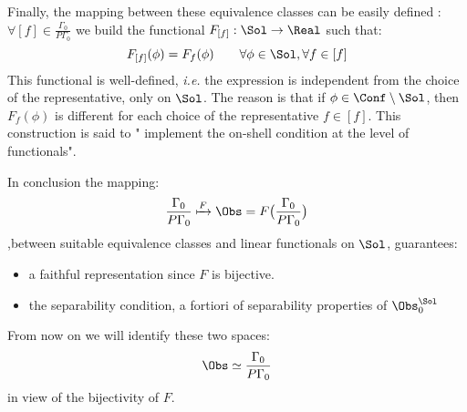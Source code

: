 \documentclass[Main]{subfiles}
\begin{document}
   					Finally, the mapping between these equivalence classes can be easily defined :\\
   					$\forall [f] \in \frac{\Gamma_0}{P\Gamma_0}$ we build the functional $F_{[f]} : \Sol \rightarrow  \Real$ such that:
   					\begin{displaymath}
   						F_{[f]} (\phi) = F_f(\phi) \qquad \forall \phi \in \Sol , \forall f \in [f]
   					\end{displaymath}
   					This functional is well-defined, \textit{i.e.} the expression is independent from the choice of the representative, only on $\Sol$. 
   					The reason is that if $\phi \in \Conf \setminus \Sol$, then $F_f(\phi)$ is different for each choice of the representative $f \in [f]$.
   					This construction is said to " implement the  on-shell condition at the level of functionals".
   					
   					In conclusion the mapping:
   					\begin{displaymath}
   						\frac{\Gamma_0}{P \Gamma_0}  \xmapsto{F} \Obs = F \big( \frac{\Gamma_0}{P \Gamma_0}\big)
   					\end{displaymath}
   					,between suitable equivalence classes  and linear functionals on $\Sol$, guarantees:
   					\begin{itemize}
   						\item a faithful representation since $F$ is bijective.
   						\item the separability condition, a fortiori of separability properties of $\Obs_0^\Sol$
   					\end{itemize}
   					From now on we will identify these two spaces:
   					\begin{displaymath}
   						\Obs \simeq 	\frac{\Gamma_0}{P \Gamma_0}
   					\end{displaymath}
   					in view of the bijectivity of $F$.
   			
\end{document}
